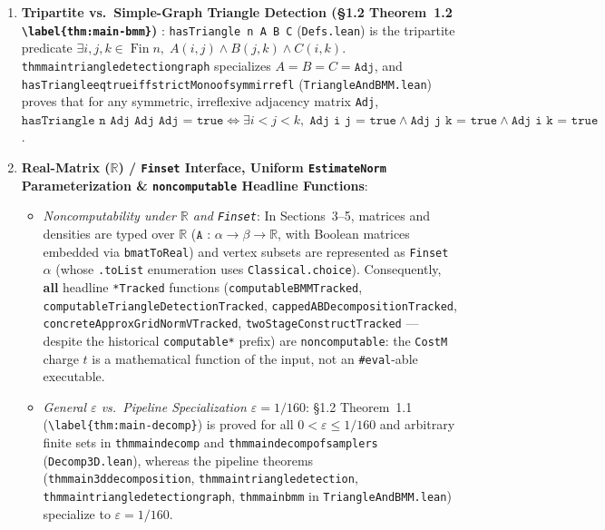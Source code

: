 \documentclass[10pt,letterpaper]{article}
\renewcommand{\_}{\origunderscore\allowbreak}
\newcommand{\code}[1]{\texttt{#1}}
\begin{document}
\begin{enumerate}
  \item \textbf{Tripartite vs.\ Simple-Graph Triangle Detection (\S 1.2 Theorem~1.2 \code{\textbackslash label\{thm:main-bmm\}}) }:
  \code{hasTriangle n A B C} (\code{Defs.lean}) is the tripartite predicate $\exists i, j, k \in \operatorname{Fin} n,\; A(i,j) \land B(j,k) \land C(i,k)$. \code{thm\_main\_triangle\_detection\_graph} specializes $A = B = C = \code{Adj}$, and \code{hasTriangle\_eq\_true\_iff\_strictMono\_of\_symm\_irrefl} (\code{TriangleAndBMM.lean}) proves that for any symmetric, irreflexive adjacency matrix \code{Adj}, $\code{hasTriangle n Adj Adj Adj = true} \iff \exists i < j < k,\; \code{Adj i j = true} \land \code{Adj j k = true} \land \code{Adj i k = true}$.

  \item \textbf{Real-Matrix ($\mathbb{R}$) / \code{Finset} Interface, Uniform \code{EstimateNorm} Parameterization \& \code{noncomputable} Headline Functions}:
  \begin{itemize}
    \item \emph{Noncomputability under $\mathbb{R}$ and \code{Finset}}: In Sections~3--5, matrices and densities are typed over $\mathbb{R}$ ($\code{A : }\alpha \to \beta \to \mathbb{R}$, with Boolean matrices embedded via \code{bmatToReal}) and vertex subsets are represented as \code{Finset $\alpha$} (whose \code{.toList} enumeration uses \code{Classical.choice}). Consequently, \textbf{all} headline \code{*Tracked} functions (\code{computableBMMTracked}, \code{computableTriangleDetectionTracked}, \code{cappedABDecompositionTracked}, \code{concreteApproxGridNormVTracked}, \code{twoStageConstructTracked} --- despite the historical \code{computable*} prefix) are \code{noncomputable}: the \code{CostM} charge $t$ is a mathematical function of the input, not an \code{\#eval}-able executable.
    \item \emph{General $\varepsilon$ vs.\ Pipeline Specialization $\varepsilon = 1/160$}: \S 1.2 Theorem~1.1 (\code{\textbackslash label\{thm:main-decomp\}}) is proved for all $0 < \varepsilon \le 1/160$ and arbitrary finite sets in \code{thm\_main\_decomp} and \code{thm\_main\_decomp\_of\_samplers} (\code{Decomp3D.lean}), whereas the pipeline theorems (\code{thm\_main\_3d\_decomposition}, \code{thm\_main\_triangle\_detection}, \code{thm\_main\_triangle\_detection\_graph}, \code{thm\_main\_bmm} in \code{TriangleAndBMM.lean}) specialize to $\varepsilon = 1/160$.

\end{itemize}
\end{enumerate}
\end{document}
